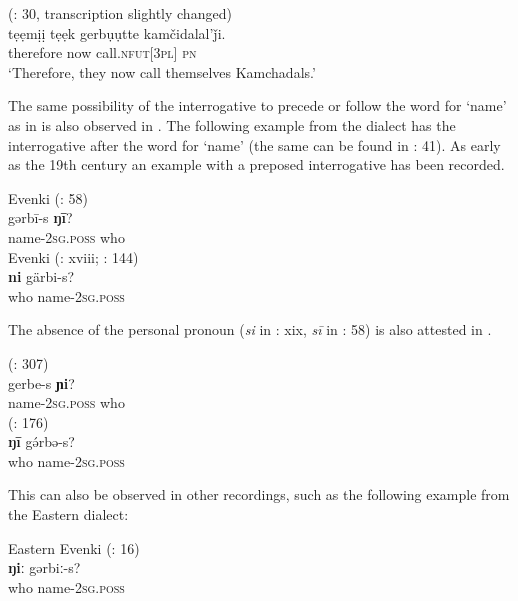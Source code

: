 \documentclass[output=paper,colorlinks,citecolor=brown]{langscibook}
\begin{document}
\ea
    \label{example4.57}
     (\citealt{Doerferetal2013}: 30, transcription slightly changed)\\
    \gll tẹẹmịị		tẹẹk		gerbụụtte		kamčidalal’ǰi.\\
    therefore		now		call.\textsc{nfut}[3\textsc{pl}]		\textsc{pn}\\
    \glt ‘Therefore, they now call themselves Kamchadals.’
    \z

The same possibility of the interrogative to precede or follow the word for ‘name’ as in  is also observed in . The following example from the  dialect has the interrogative after the word for ‘name’ (the same can be found in \citealt{Konstantinova1964H}: 41). As early as the 19th century an example with a preposed interrogative has been recorded.

\ea
    \label{example4.58}
     Evenki (\citealt{BulatovaCotrozzi2004}: 58)\\
    \gll gərbī-s			\textbf{ŋī}?\\
    name-2\textsc{sg.poss}		who\\
\ex
    \label{example4.59}
     Evenki (\citealt{Maack1859}: xviii; \citealt{Schiefner1878}: 144)\\
    \gll \textbf{ni}		gärbi-s?\\
    who		name-2\textsc{sg.poss}\\
\z

\noindent The absence of the personal pronoun (\textit{si} in \citealt{Maack1859}: xix, \textit{sī} in \citealt{BulatovaCotrozzi2004}: 58) is also attested in .

\ea
    \label{example4.60}
     (\citealt{Idiatov2007}: 307)\\
    \gll gerbe-s			\textbf{ɲi}?\\
    name-2\textsc{sg.poss}		who\\
\ex
    \label{example4.61}
     (\citealt{Benzing1955}: 176)\\
    \gll \textbf{ŋī}		gə́rbə-s?\\
    who		name-2\textsc{sg.poss}\\
\z

This can also be observed in other  recordings, such as the following example from the Eastern dialect:

\ea
    \label{example4.62}
    Eastern Evenki (\citealt{Makarova1999}: 16)\\
    \ea
    \gll \textbf{ŋiː}		gərbiː-s?\\
    who		name-2\textsc{sg.poss}\\
\end{document}
